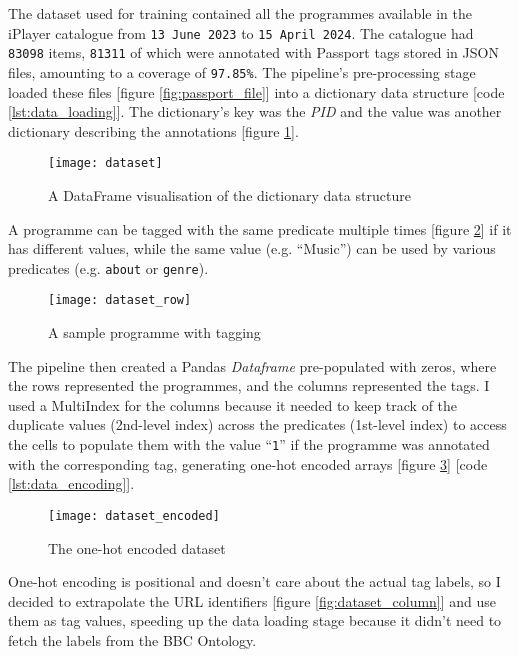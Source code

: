 
The dataset used for training contained all the programmes available in the iPlayer catalogue from \verb|13 June 2023| to \verb|15 April 2024|.
The catalogue had \verb|83098| items, \verb|81311| of which were annotated with Passport tags stored in JSON files, amounting to a coverage of \verb|97.85%|.
The pipeline's pre-processing stage loaded these files [figure \ref{fig:passport_file}] into a dictionary data structure [code \ref{lst:data_loading}].
The dictionary's key was the \textit{PID} and the value was another dictionary describing the annotations [figure \ref{fig:dataset}].

\begin{figure}[h]
  \centering
  \texttt{[image: dataset]}
  \caption{A DataFrame visualisation of the dictionary data structure}
  \label{fig:dataset}
\end{figure}

A programme can be tagged with the same predicate multiple times [figure \ref{fig:dataset_row}] if it has different values,
while the same value (e.g. ``Music'') can be used by various predicates (e.g. \verb|about| or \verb|genre|).

\begin{figure}[h]
  \centering
  \texttt{[image: dataset\_row]}
  \caption{A sample programme with tagging}
  \label{fig:dataset_row}
\end{figure}

The pipeline then created a Pandas \textit{Dataframe} pre-populated with zeros,
where the rows represented the programmes, and the columns represented the tags.
I used a MultiIndex \cite{Pandas:MultiIndex} for the columns because it needed to keep track of the duplicate values (2nd-level index)
across the predicates (1st-level index) to access the cells to populate them with the value ``\verb|1|''
if the programme was annotated with the corresponding tag, generating one-hot encoded arrays [figure \ref{fig:dataset_encoded}] [code \ref{lst:data_encoding}].

\begin{figure}[h]
  \centering
  \texttt{[image: dataset\_encoded]}
  \caption{The one-hot encoded dataset}
  \label{fig:dataset_encoded}
\end{figure}

One-hot encoding is positional and doesn't care about the actual tag labels,
so I decided to extrapolate the URL identifiers [figure \ref{fig:dataset_column}] and use them as tag values,
speeding up the data loading stage because it didn't need to fetch the labels from the BBC Ontology.


